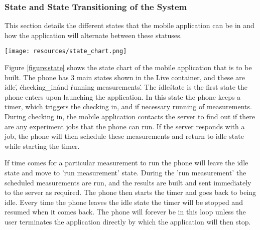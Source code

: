 \subsubsection{State and State Transitioning of the System}\label{subsec:state-and-state-transitioning-of-the-system}
This section details the different states that the mobile application can be in and how the application will alternate between these statuses.
\begin{figure*}
    \begin{center}
        \texttt{[image: resources/state\_chart.png]}
    \end{center}
    \caption{Showing State Machine Chart for the mobile application that we will be building}
    \label{figure:state}
\end{figure*}
Figure \ref{figure:state}  shows the state chart of the mobile application that is to be built.
The phone has 3 main states shown in the Live container, and these are \'idle\', \'checking\_in\' and \'running measurements\'.
The \'idle\' state is the first state the phone enters upon launching the application.
In this state the phone keeps a timer, which triggers the checking in, and if necessary running of measurements.
During checking in, the mobile application contacts the server to find out if there are any experiment jobs that the phone can run.
If the server responds with a job, the phone will then schedule these measurements and return to idle state while starting the timer.

If time comes for a particular measurement to run the phone will leave the idle state and move to 'run measurement' state.
During the 'run measurement' the scheduled measurements are run, and the results are built and sent immediately to the server as required.
The phone then starts the timer and goes back to being idle.
Every time the phone leaves the idle state the timer will be stopped and resumed when it comes back.
The phone will forever be in this loop unless the user terminates the application directly by which the application will then stop.

